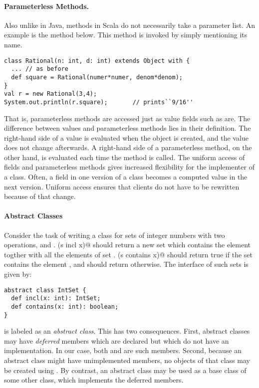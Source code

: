 \documentclass[11pt]{book}
\begin{document}
\paragraph{Parameterless Methods.}
Also unlike in Java, methods in Scala do not necessarily take a
parameter list. An example is the \verb@square@ method below. This
method is invoked by simply mentioning its name. 
\begin{verbatim}
class Rational(n: int, d: int) extends Object with {
  ... // as before
  def square = Rational(numer*numer, denom*denom);
}
val r = new Rational(3,4);
System.out.println(r.square);		// prints``9/16''
\end{verbatim}
That is, parameterless methods are accessed just as value fields such
as \verb@numer@ are. The difference between values and parameterless
methods lies in their definition. The right-hand side of a value is
evaluated when the object is created, and the value does not change
afterwards. A right-hand side of a parameterless method, on the other
hand, is evaluated each time the method is called.  The uniform access
of fields and parameterless methods gives increased flexibility for
the implementer of a class. Often, a field in one version of a class
becomes a computed value in the next version. Uniform access ensures
that clients do not have to be rewritten because of that change.

\paragraph{Abstract Classes}

Consider the task of writing a class for sets of integer numbers with
two operations, \verb@incl@ and \verb@contains@. \verb@(s incl x)@
should return a new set which contains the element \verb@x@ togther
with all the elements of set \verb@s@. \verb@(s contains x)@ should
return true if the set \verb@s@ contains the element \verb@x@, and
should return \verb@false@ otherwise. The interface of such sets is
given by:  
\begin{verbatim}
abstract class IntSet {
  def incl(x: int): IntSet;
  def contains(x: int): boolean;
}
\end{verbatim}
\verb@IntSet@ is labeled as an \emph{abstract class}. This has two
consequences.  First, abstract classes may have {\em deferred} members
which are declared but which do not have an implementation. In our
case, both \verb@incl@ and \verb@contains@ are such members. Second,
because an abstract class might have unimplemented members, no objects
of that class may be created using \verb@new@. By contrast, an
abstract class may be used as a base class of some other class, which
implements the deferred members.
\end{document}

